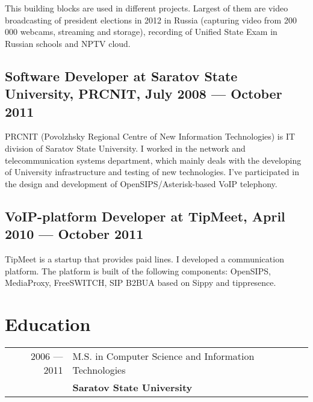\documentclass[a4paper,10pt]{article}
\begin{document}
This building blocks are used in different projects. Largest of them are video broadcasting of president elections in 2012 in Russia (capturing video from 200 000 webcams, streaming and storage), recording of Unified State Exam in Russian schools and NPTV cloud.

\subsection{Software Developer at Saratov State University, PRCNIT, July 2008 ---
October 2011}
PRCNIT (Povolzhsky Regional Centre of New Information Technologies) is IT division of Saratov State University. I worked in the network and telecommunication systems department, which mainly deals with the developing of University infrastructure and testing of new technologies. I've participated in the design and development of OpenSIPS/Asterisk-based VoIP telephony.

\subsection{VoIP-platform Developer at TipMeet, April 2010 --- October 2011}
TipMeet is a startup that provides paid lines. I developed a communication platform. The platform is built of the following components: OpenSIPS, MediaProxy, FreeSWITCH, SIP B2BUA based on Sippy and tippresence.

\section{Education}
\begin{tabular}{rl}
2006 --- 2011& M.S. in Computer Science and Information
Technologies \\& \textbf{Saratov State University}
\end{tabular}
\end{document}
